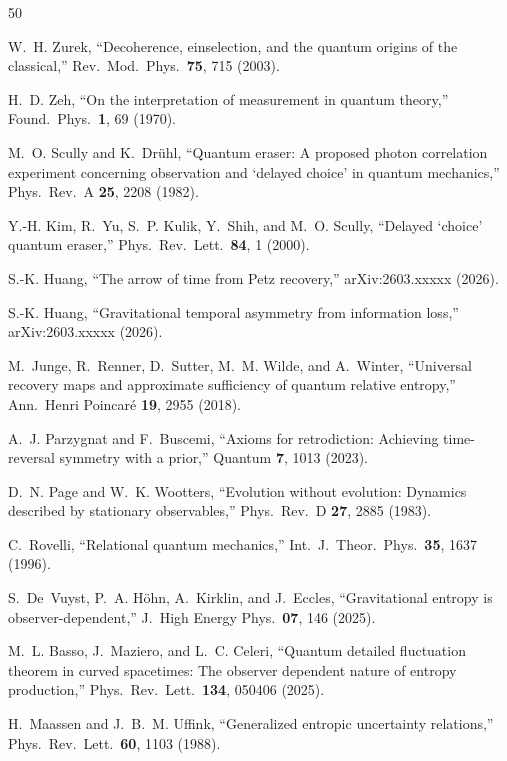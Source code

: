 \documentclass[prl,twocolumn,superscriptaddress,longbibliography,floatfix]{revtex4-2}
\begin{document}
\begin{thebibliography}{50}

W.~H. Zurek,
``Decoherence, einselection, and the quantum origins of the
classical,''
Rev.\ Mod.\ Phys.\ \textbf{75}, 715 (2003).

H.~D. Zeh,
``On the interpretation of measurement in quantum theory,''
Found.\ Phys.\ \textbf{1}, 69 (1970).

M.~O. Scully and K.~Dr\"uhl,
``Quantum eraser: A proposed photon correlation experiment
concerning observation and `delayed choice' in quantum mechanics,''
Phys.\ Rev.\ A \textbf{25}, 2208 (1982).

Y.-H. Kim, R.~Yu, S.~P. Kulik, Y.~Shih, and M.~O. Scully,
``Delayed `choice' quantum eraser,''
Phys.\ Rev.\ Lett.\ \textbf{84}, 1 (2000).

S.-K. Huang,
``The arrow of time from Petz recovery,''
arXiv:2603.xxxxx (2026).

S.-K. Huang,
``Gravitational temporal asymmetry from information loss,''
arXiv:2603.xxxxx (2026).

M.~Junge, R.~Renner, D.~Sutter, M.~M. Wilde, and A.~Winter,
``Universal recovery maps and approximate sufficiency of quantum
relative entropy,''
Ann.\ Henri Poincar\'e \textbf{19}, 2955 (2018).

A.~J. Parzygnat and F.~Buscemi,
``Axioms for retrodiction: Achieving time-reversal symmetry with
a prior,''
Quantum \textbf{7}, 1013 (2023).

D.~N. Page and W.~K. Wootters,
``Evolution without evolution: Dynamics described by stationary
observables,''
Phys.\ Rev.\ D \textbf{27}, 2885 (1983).

C.~Rovelli,
``Relational quantum mechanics,''
Int.\ J.\ Theor.\ Phys.\ \textbf{35}, 1637 (1996).

S.~De~Vuyst, P.~A. H\"ohn, A.~Kirklin, and J.~Eccles,
``Gravitational entropy is observer-dependent,''
J.\ High Energy Phys.\ \textbf{07}, 146 (2025).

M.~L. Basso, J.~Maziero, and L.~C. Celeri,
``Quantum detailed fluctuation theorem in curved spacetimes:
The observer dependent nature of entropy production,''
Phys.\ Rev.\ Lett.\ \textbf{134}, 050406 (2025).

H.~Maassen and J.~B.~M. Uffink,
``Generalized entropic uncertainty relations,''
Phys.\ Rev.\ Lett.\ \textbf{60}, 1103 (1988).


\end{thebibliography}
\end{document}
